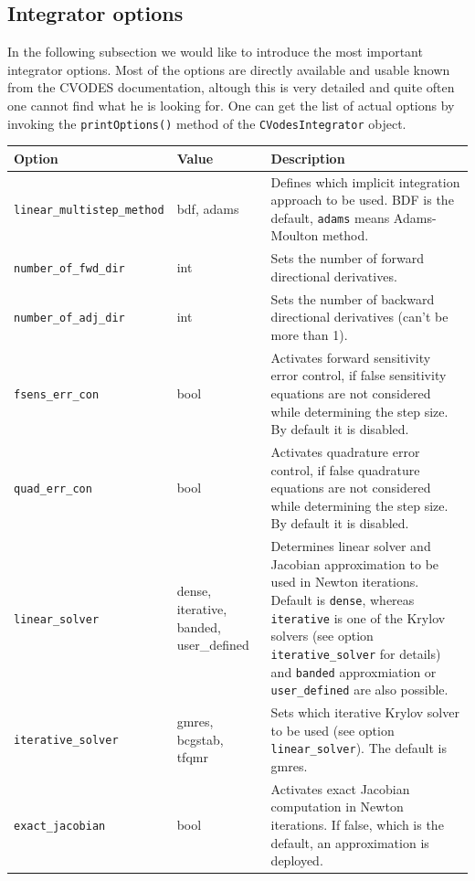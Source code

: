 \documentclass[a4paper,12pt]{book}
\begin{document}
{\subsection*{Integrator options}
In the following subsection we would like to introduce the most important integrator options. Most of the options are directly available and usable
 known from the CVODES documentation, altough this is very detailed and quite often one cannot find what he is looking for. One can get the 
 list of actual options by invoking the \texttt{printOptions()} method of the \texttt{CVodesIntegrator} object.
 \begin{center}
 \small
 \begin{tabular}{|m{5.3cm}|m{2.3cm}|m{17cm}|}
 \hline
 \textbf{Option} & \textbf{Value} & \textbf{Description}\\
 \hline
 \hline
  \texttt{linear\_multistep\_method} & bdf, adams & Defines which implicit integration approach to be used. BDF is the default, 
 \texttt{adams} means  Adams-Moulton method.\\
 \hline
 \texttt{number\_of\_fwd\_dir} & int & Sets the number of forward directional derivatives.\\
 \hline
 \texttt{number\_of\_adj\_dir} & int & Sets the number of backward directional derivatives (can't be more than 1).\\
 \hline
 \texttt{fsens\_err\_con} & bool & Activates forward sensitivity error control, if false sensitivity equations are not considered while
 determining the step size. By default it is disabled. \\
 \hline
 \texttt{quad\_err\_con} & bool & Activates quadrature error control, if false quadrature equations are not considered while determining
 the step size. By default it is disabled.\\
 \hline 
 \texttt{linear\_solver} & dense, iterative, banded, user\_defined & Determines linear solver and Jacobian approximation to be used in Newton iterations. Default is \texttt{dense},
 whereas \texttt{iterative} is one of the Krylov solvers (see option \texttt{iterative\_solver} for details) and
 \texttt{banded} approxmiation or  \texttt{user\_defined} are also possible.\\
 \hline
 \texttt{iterative\_solver} & gmres, bcgstab, tfqmr & Sets which iterative Krylov solver to be used (see option \texttt{linear\_solver}). 
 The default is gmres.  \\
 \hline
 \texttt{exact\_jacobian} & bool & Activates exact Jacobian computation in Newton iterations. If false, which is the default, an approximation is deployed.\\

\end{tabular}
\end{center}}
\end{document}

